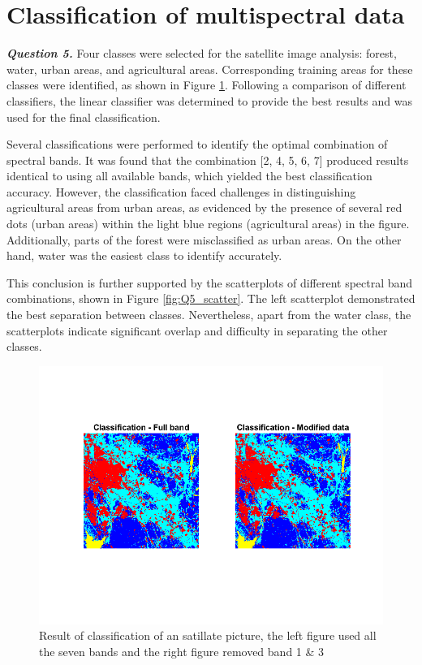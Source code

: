 \documentclass[12pt]{article}
\begin{document}
\section{Classification of multispectral data}
\textbf{\emph{Question 5.}}
Four classes were selected for the satellite image analysis: forest, water, urban areas, and agricultural areas. Corresponding training areas for these classes were identified, as shown in Figure \ref{fig:Q5_res}. Following a comparison of different classifiers, the linear classifier was determined to provide the best results and was used for the final classification.

Several classifications were performed to identify the optimal combination of spectral bands. It was found that the combination [2, 4, 5, 6, 7] produced results identical to using all available bands, which yielded the best classification accuracy. However, the classification faced challenges in distinguishing agricultural areas from urban areas, as evidenced by the presence of several red dots (urban areas) within the light blue regions (agricultural areas) in the figure. Additionally, parts of the forest were misclassified as urban areas. On the other hand, water was the easiest class to identify accurately.

This conclusion is further supported by the scatterplots of different spectral band combinations, shown in Figure \ref{fig:Q5_scatter}. The left scatterplot demonstrated the best separation between classes. Nevertheless, apart from the water class, the scatterplots indicate significant overlap and difficulty in separating the other classes.
\begin{figure}
  \centering
  \includegraphics[width = 15cm]{images/Q5_result.png}
  \caption{Result of classification of an satillate picture, the left figure used all the seven bands and the right figure removed band 1 & 3}
  \label{fig:Q5_res}
\end{figure}
\end{document}
